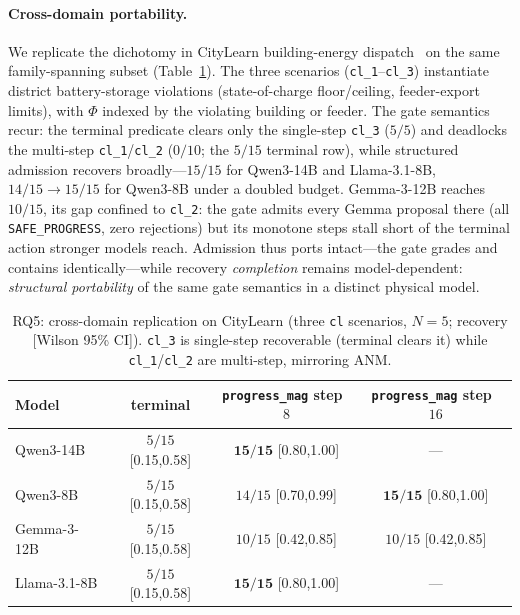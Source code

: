 \paragraph{Cross-domain portability.}
We replicate the dichotomy in CityLearn building-energy dispatch~\cite{citylearn} on the same family-spanning subset (Table~\ref{tab:crossdomain}). The three scenarios (\texttt{cl\_1}--\texttt{cl\_3}) instantiate district battery-storage violations (state-of-charge floor/ceiling, feeder-export limits), with $\Phi$ indexed by the violating building or feeder. The gate semantics recur: the terminal predicate clears only the single-step \texttt{cl\_3} ($5/5$) and deadlocks the multi-step \texttt{cl\_1}/\texttt{cl\_2} ($0/10$; the $5/15$ terminal row), while structured admission recovers broadly---$15/15$ for Qwen3-14B and Llama-3.1-8B, $14/15{\to}15/15$ for Qwen3-8B under a doubled budget. Gemma-3-12B reaches $10/15$, its gap confined to \texttt{cl\_2}: the gate admits every Gemma proposal there (all \texttt{SAFE\_PROGRESS}, zero rejections) but its monotone steps stall short of the terminal action stronger models reach. Admission thus ports intact---the gate grades and contains identically---while recovery \emph{completion} remains model-dependent: \emph{structural portability} of the same gate semantics in a distinct physical model.

\begin{table}[ht]
\centering
\caption{RQ5: cross-domain replication on CityLearn (three \texttt{cl} scenarios, $N{=}5$; recovery [Wilson 95\% CI]). \texttt{cl\_3} is single-step recoverable (terminal clears it) while \texttt{cl\_1}/\texttt{cl\_2} are multi-step, mirroring ANM.}
\label{tab:crossdomain}
\footnotesize
\setlength{\tabcolsep}{5pt}
\begin{tabular*}{\textwidth}{@{\extracolsep{\fill}}lccc}
\toprule
Model & terminal & \texttt{progress\_mag} step~$8$ & \texttt{progress\_mag} step~$16$ \\
\midrule
Qwen3-14B    & $5/15$ {\scriptsize[0.15,0.58]}  & $\mathbf{15/15}$ {\scriptsize[0.80,1.00]} & --- \\
Qwen3-8B     & $5/15$ {\scriptsize[0.15,0.58]}  & $14/15$ {\scriptsize[0.70,0.99]} & $\mathbf{15/15}$ {\scriptsize[0.80,1.00]} \\
Gemma-3-12B  & $5/15$ {\scriptsize[0.15,0.58]}  & $10/15$ {\scriptsize[0.42,0.85]} & $10/15$ {\scriptsize[0.42,0.85]} \\
Llama-3.1-8B & $5/15$ {\scriptsize[0.15,0.58]}  & $\mathbf{15/15}$ {\scriptsize[0.80,1.00]} & --- \\
\bottomrule
\end{tabular*}
\end{table}

